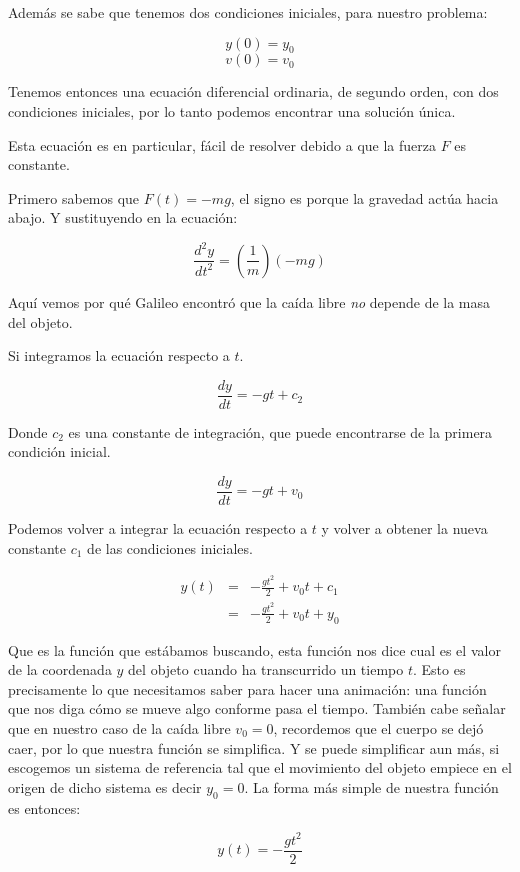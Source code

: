 Además se sabe que tenemos dos condiciones iniciales, para nuestro problema:

$$ y(0) = y_0 $$
$$ v(0) = v_0 $$

Tenemos entonces una ecuación diferencial ordinaria, de segundo orden, con dos condiciones iniciales, por lo tanto podemos encontrar una solución única.

Esta ecuación es en particular, fácil de resolver debido a que la fuerza $F$ es constante.

Primero sabemos que $F(t) = -mg$, el signo es porque la gravedad actúa hacia abajo.
Y sustituyendo en la ecuación:

\begin{equation}
\label{fuerzaGravedad}
\frac{d^2y}{dt^2} = \left(\frac{1}{m}\right)\left( -mg \right) 
\end{equation}

Aquí vemos por qué Galileo encontró que la caída libre \emph{no} depende de la masa del objeto.

Si integramos la ecuación respecto a $t$.

$$ \frac{dy}{dt} = -gt + c_2 $$

Donde $c_2$ es una constante de integración, que puede encontrarse de la primera condición inicial.

$$ \frac{dy}{dt} = -gt + v_0 $$

Podemos volver a integrar la ecuación respecto a $t$ y volver a obtener la nueva constante $c_1$ de las condiciones iniciales.

\begin{eqnarray}
 y(t) & = & -\frac{gt^2}{2} + v_0t + c_1 \nonumber \\
      & = & -\frac{gt^2}{2} + v_0t + y_0
\end{eqnarray}

Que es la función que estábamos buscando, esta función nos dice cual es el valor de la coordenada $y$ del objeto cuando ha transcurrido un tiempo $t$.
Esto es precisamente lo que necesitamos saber para hacer una animación: una función que nos diga cómo se mueve algo conforme pasa el tiempo.
También cabe señalar que en nuestro caso de la caída libre $v_0 = 0$, recordemos que el cuerpo se dejó caer, por lo que nuestra función se simplifica.
Y se puede simplificar aun más, si escogemos un sistema de referencia tal que el movimiento del objeto empiece en el origen de dicho sistema es decir $y_0 = 0$.
La forma más simple de nuestra función es entonces:

\begin{equation}
 y(t) = -\frac{gt^2}{2}
\end{equation}


